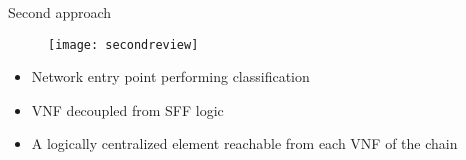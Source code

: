 \begin{frame}{Second approach}

  \vspace{-0.5cm}

  \begin{figure}
    \centering
    \texttt{[image: secondreview]}
  \end{figure}

  \vspace{-0.4cm}

  \begin{itemize}
    \item Network entry point performing classification
    \item VNF decoupled from SFF logic
    \item A logically centralized element reachable from each VNF of the chain
  \end{itemize}

\end{frame}